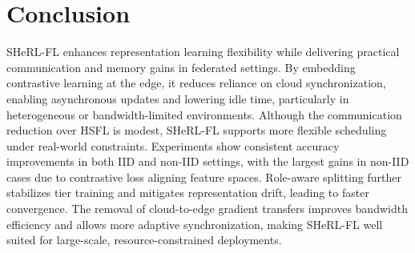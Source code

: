 \documentclass[letterpaper]{article} %
\begin{document}
\section{Conclusion}
SHeRL-FL enhances representation learning flexibility while delivering practical communication and memory gains in federated settings. By embedding contrastive learning at the edge, it reduces reliance on cloud synchronization, enabling asynchronous updates and lowering idle time, particularly in heterogeneous or bandwidth-limited environments. Although the communication reduction over HSFL is modest, SHeRL-FL supports more flexible scheduling under real-world constraints. Experiments show consistent accuracy improvements in both IID and non-IID settings, with the largest gains in non-IID cases due to contrastive loss aligning feature spaces. Role-aware splitting further stabilizes tier training and mitigates representation drift, leading to faster convergence. The removal of cloud-to-edge gradient transfers improves bandwidth efficiency and allows more adaptive synchronization, making SHeRL-FL well suited for large-scale, resource-constrained deployments.







\end{document}
